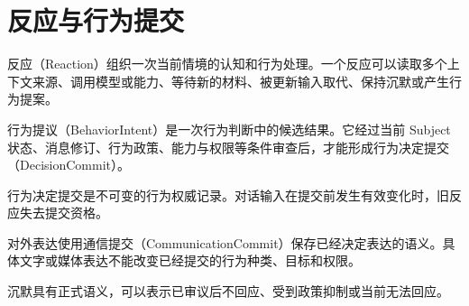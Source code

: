 \chapter{反应与行为提交}

反应（Reaction）组织一次当前情境的认知和行为处理。一个反应可以读取多个上下文来源、调用模型或能力、等待新的材料、被更新输入取代、保持沉默或产生行为提案。

行为提议（BehaviorIntent）是一次行为判断中的候选结果。它经过当前 Subject 状态、消息修订、行为政策、能力与权限等条件审查后，才能形成行为决定提交（DecisionCommit）。

行为决定提交是不可变的行为权威记录。对话输入在提交前发生有效变化时，旧反应失去提交资格。

对外表达使用通信提交（CommunicationCommit）保存已经决定表达的语义。具体文字或媒体表达不能改变已经提交的行为种类、目标和权限。

沉默具有正式语义，可以表示已审议后不回应、受到政策抑制或当前无法回应。

